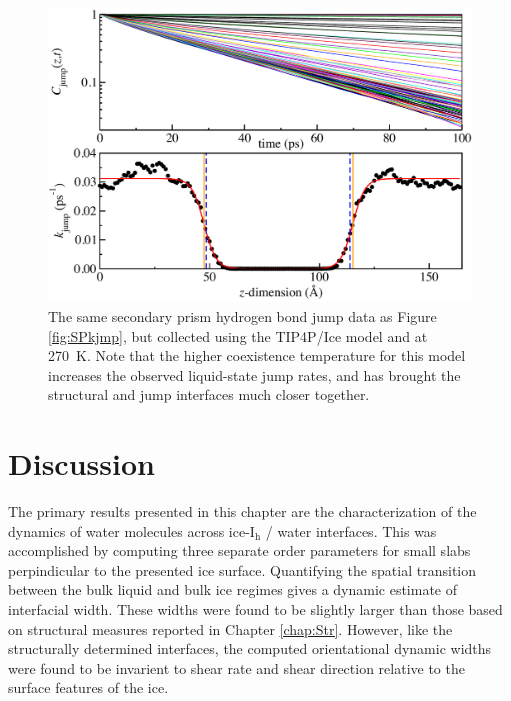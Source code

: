 \begin{figure}
\includegraphics[width=\linewidth]{Figures/secprismJumpPlotTIP4PIce}
\caption{\label{fig:SPTIP4Pkjmp} The same secondary prism hydrogen
  bond jump data as Figure \ref{fig:SPkjmp}, but collected using the
  TIP4P/Ice model and at 270~K.  Note that the higher coexistence
  temperature for this model increases the observed liquid-state jump
  rates, and has brought the structural and jump interfaces much
  closer together.}
\end{figure}


\section{Discussion}
The primary results presented in this chapter are the characterization
of the dynamics of water molecules across ice-I$_\mathrm{h}$ / water
interfaces. This was accomplished by computing three separate order
parameters for small slabs perpindicular to the presented ice
surface. Quantifying the spatial transition between the bulk liquid
and bulk ice regimes gives a dynamic estimate of interfacial
width. These widths were found to be slightly larger than those based
on structural measures reported in Chapter \ref{chap:Str}. However,
like the structurally determined interfaces, the computed
orientational dynamic widths were found to be invarient to shear rate
and shear direction relative to the surface features of the ice.

